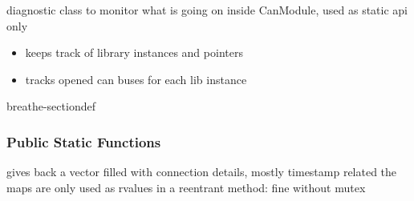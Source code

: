 \documentclass[a4paper,10pt,english]{sphinxmanual}
\begin{document}
\begin{fulllineitems}
\label{\detokenize{classestracing:_CPPv4N9CanModule4DiagE}}%
\pysigstartmultiline
{}%
\pysigstopmultiline
\sphinxAtStartPar
diagnostic class to monitor what is going on inside CanModule, used as static api only\begin{itemize}
\item {} 
\sphinxAtStartPar
keeps track of library instances and pointers

\item {} 
\sphinxAtStartPar
tracks opened can buses for each lib instance 

\end{itemize}


\begin{sphinxuseclass}{breathe-sectiondef}\subsubsection*{Public Static Functions}

\begin{fulllineitems}
\label{\detokenize{classestracing:_CPPv4N9CanModule4Diag15get_connectionsEv}}%
\pysigstartmultiline
{}%
\pysigstopmultiline
\sphinxAtStartPar
gives back a vector filled with connection details, mostly timestamp related the maps are only used as rvalues in a reentrant method: fine without mutex 

\end{fulllineitems}


\end{sphinxuseclass}
\end{fulllineitems}
\end{document}
